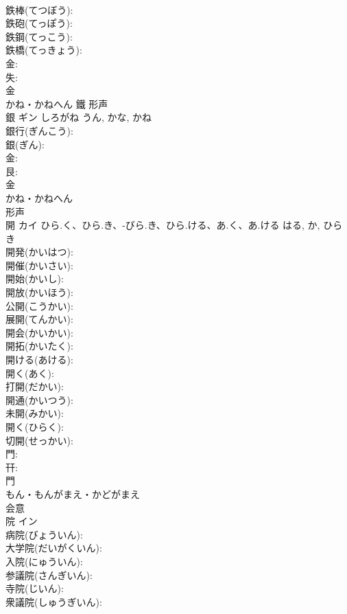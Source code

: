 \documentclass[8pt]{extreport}
\begin{document}
\begin{CJK}{UTF8}{min}
\\	鉄棒(てつぼう): 
\\	鉄砲(てっぽう): 
\\	鉄鋼(てっこう): 
\\	鉄橋(てっきょう): 
\\	金: 
\\	失: 
\\	金	
\\	かね・かねへん	鐵	形声 
\\	銀	ギン	しろがね	うん, かな, かね	
\\	銀行(ぎんこう): 
\\	銀(ぎん): 
\\	金: 
\\	艮: 
\\	金	
\\	かね・かねへん	
\\	形声 
\\	開	カイ	ひら.く、ひら.き、-びら.き、ひら.ける、あ.く、あ.ける	はる, か, ひらき	
\\	開発(かいはつ): 
\\	開催(かいさい): 
\\	開始(かいし): 
\\	開放(かいほう): 
\\	公開(こうかい): 
\\	展開(てんかい): 
\\	開会(かいかい): 
\\	開拓(かいたく): 
\\	開ける(あける): 
\\	開く(あく): 
\\	打開(だかい): 
\\	開通(かいつう): 
\\	未開(みかい): 
\\	開く(ひらく): 
\\	切開(せっかい): 
\\	門: 
\\	幵: 
\\	門	
\\	もん・もんがまえ・かどがまえ	
\\	会意 
\\	院	イン			
\\	病院(びょういん): 
\\	大学院(だいがくいん): 
\\	入院(にゅういん): 
\\	参議院(さんぎいん): 
\\	寺院(じいん): 
\\	衆議院(しゅうぎいん): 

\end{CJK}
\end{document}
